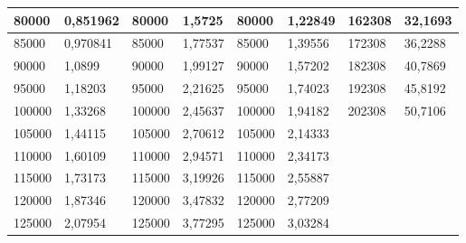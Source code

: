 \documentclass[11pt,openany]{book}
\begin{document}
\begin{table}[!ht]
\begin{tabular}{|l|l|l|l|l|l|l|l|}
        80000 & 0,851962 & 80000 & 1,5725 & 80000 & 1,22849 & 162308 & 32,1693 \\ \hline
        85000 & 0,970841 & 85000 & 1,77537 & 85000 & 1,39556 & 172308 & 36,2288 \\ \hline
        90000 & 1,0899 & 90000 & 1,99127 & 90000 & 1,57202 & 182308 & 40,7869 \\ \hline
        95000 & 1,18203 & 95000 & 2,21625 & 95000 & 1,74023 & 192308 & 45,8192 \\ \hline
        100000 & 1,33268 & 100000 & 2,45637 & 100000 & 1,94182 & 202308 & 50,7106 \\ \hline
        105000 & 1,44115 & 105000 & 2,70612 & 105000 & 2,14333 & ~ & ~ \\ \hline
        110000 & 1,60109 & 110000 & 2,94571 & 110000 & 2,34173 & ~ & ~ \\ \hline
        115000 & 1,73173 & 115000 & 3,19926 & 115000 & 2,55887 & ~ & ~ \\ \hline
        120000 & 1,87346 & 120000 & 3,47832 & 120000 & 2,77209 & ~ & ~ \\ \hline
        125000 & 2,07954 & 125000 & 3,77295 & 125000 & 3,03284 & ~ & \\\hline
    \end{tabular}
\end{table}
\end{document}
